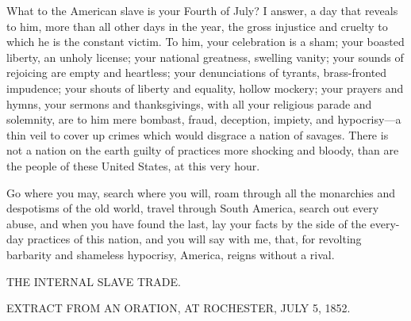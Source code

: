 What to the American slave is your Fourth of July? I answer, a day that
reveals to him, more than all other days in the year, the gross
injustice and cruelty to which he is the constant victim. To him, your
celebration is a sham; your boasted liberty, an unholy license; your
national greatness, swelling vanity; your sounds of rejoicing are empty
and heartless; your denunciations of tyrants, brass-fronted impudence;
your shouts of liberty and equality, hollow mockery; your prayers and
hymns, your sermons and thanksgivings, with all your religious parade
and solemnity, are to him mere bombast, fraud, deception, impiety, and
hypocrisy---a thin veil to cover up crimes which would disgrace a nation
of savages. There is not a nation on the earth guilty of practices more
shocking and bloody, than are the people of these United States, at this
very hour.

Go where you may, search where you will, roam through all the monarchies
and despotisms of the old world, travel through South America, search
out every abuse, and when you have found the last, lay your facts by the
side of the every-day practices of this nation, and you will say with
me, that, for revolting barbarity and shameless hypocrisy, America,
reigns without a rival.

{\protect\hypertarget{ux5cux7bux5cux7bux5cux7b1ux5cux7dux5cux7dux5cux7d}{}{}}

{\protect\hypertarget{446}{}{}}

{THE INTERNAL SLAVE TRADE.}

{EXTRACT FROM AN ORATION, AT ROCHESTER, JULY 5, 1852.}

